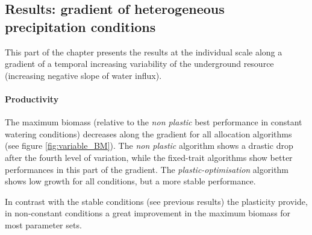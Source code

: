 


\subsection{Results: gradient of heterogeneous precipitation conditions}

This part of the chapter presents the results at the individual scale along a gradient of a temporal increasing variability of the underground resource (increasing negative slope of water influx).

\paragraph{Productivity}
The maximum biomass (relative to the \textit{non plastic} best performance in constant watering conditions) decreases along the gradient for all allocation algorithms (see figure \ref{fig:variable_BM}). The \textit{non plastic} algorithm shows a drastic drop after the fourth level of variation, while the fixed-trait algorithms show better performances in this part of the gradient. The \textit{plastic-optimisation} algorithm shows low growth for all conditions, but a more stable performance.

In contrast with the stable conditions (see previous results) the plasticity provide, in non-constant conditions a great improvement in the maximum biomass for most parameter sets. 

